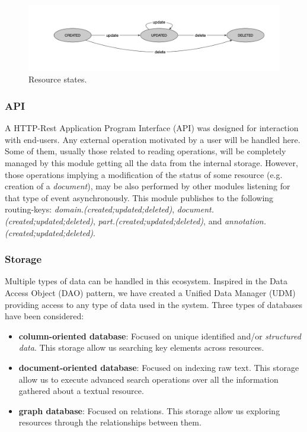 \begin{figure}
  \includegraphics[scale=0.3]{resource-states}
  \caption{Resource states.}
  \label{fig:librairy-states}
\end{figure}


\subsubsection{API}

A HTTP-Rest Application Program Interface (API) was designed for interaction with end-users. Any external operation motivated by a user will be handled here. Some of them, usually those related to reading operations, will be completely managed by this module getting all the data from the internal storage. However, those operations implying a modification of the status of some resource (e.g. creation of a \textit{document}), may be also performed by other modules listening for that type of event asynchronously. This module publishes to the following routing-keys: \textit{domain.(created;updated;deleted)}, \textit{document.(created;updated;deleted)}, \textit{part.(created;updated;deleted)}, and \textit{annotation.(created;updated;deleted)}.

\subsubsection{Storage}

Multiple types of data can be handled in this ecosystem. Inspired in the Data Access Object (DAO) pattern, we have created a Unified Data Manager (UDM) providing access to any type of data used in the system.  Three types of databases have been considered:
\begin{itemize}
	\item \textbf{column-oriented database}: Focused on unique identified and/or \textit{structured data}. This storage allow us searching key elements across resources. 
	\item \textbf{document-oriented database}: Focused on indexing raw text. This storage allow us to execute advanced search operations over all the information gathered about a textual resource. 
    \item \textbf{graph database}: Focused on relations. This storage allow us exploring resources through the relationships between them.
\end{itemize}

